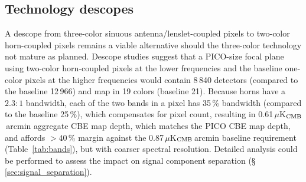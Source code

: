 








\subsection{Technology descopes}
\label{sec:technology_descopes} %

A descope from three-color sinuous antenna/lenslet-coupled pixels to two-color horn-coupled pixels remains a viable
alternative should the three-color technology not mature as
planned. Descope studies suggest that a PICO-size focal plane using
two-color horn-coupled pixels at the lower frequencies and the baseline one-color
pixels at the higher frequencies would contain 8\,840 detectors
(compared to the baseline 12\,966) and map in 19 colors (baseline
21). Because horns have a $2.3:1$ bandwidth, each of the two bands in
a pixel has 35\,\% bandwidth (compared to the baseline 25\,\%), which
compensates for pixel count, resulting in
0.61\,$\mu$K$_{\rm CMB}$\,arcmin aggregate CBE map depth, which
matches the PICO CBE map depth, and affords $>40\,\%$ margin against
the 0.87\,$\mu$K$_{\rm CMB}$\,arcmin baseline requirement
(Table~\ref{tab:bands}), but with coarser spectral resolution.
Detailed analysis could be performed to assess the impact on signal component separation (\S\,\ref{sec:signal_separation}).

